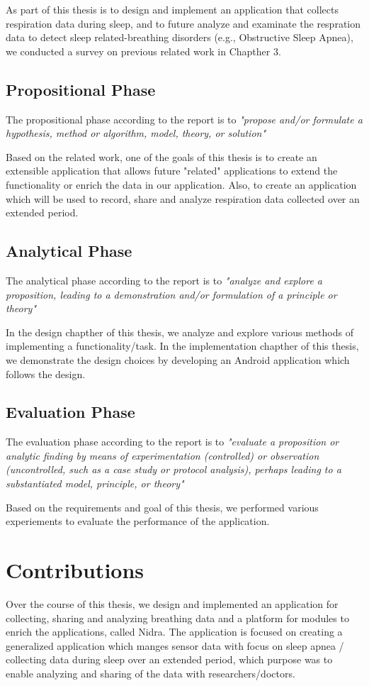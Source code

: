 As part of this thesis is to design and implement an application that collects respiration data during sleep, and to future analyze and examinate the respration data to detect sleep related-breathing disorders (e.g., Obstructive Sleep Apnea), we conducted a survey on previous related work in Chapther 3.

\subsection{Propositional Phase}
The propositional phase according to the report is to \textit{"propose and/or formulate a hypothesis, method or algorithm, model, theory, or solution"}

Based on the related work, one of the goals of this thesis is to create an extensible application that allows future "related" applications to extend the functionality or enrich the data in our application. Also, to create an application which will be used to record, share and analyze respiration data collected over an extended period. 

\subsection{Analytical Phase}
The analytical phase according to the report is to \textit{"analyze and explore a proposition, leading to a demonstration and/or formulation of a principle or theory"}

In the design chapther of this thesis, we analyze and explore various methods of implementing a functionality/task. In the implementation chapther of this thesis, we demonstrate the design choices by developing an Android application which follows the design. 

\subsection{Evaluation Phase}
The evaluation phase according to the report is to \textit{"evaluate a proposition or analytic finding by means of experimentation (controlled) or observation (uncontrolled, such as a case study or protocol analysis), perhaps leading to a substantiated model, principle, or theory"}

Based on the requirements and goal of this thesis, we performed various experiements to evaluate the performance of the application.

\section{Contributions}
Over the course of this thesis, we design and implemented an application for collecting, sharing and analyzing breathing data and a platform for modules to enrich the applications, called Nidra. The application is focused on creating a generalized application which manges sensor data with focus on sleep apnea / collecting data during sleep over an extended period, which purpose was to enable analyzing and sharing of the data with researchers/doctors.  


